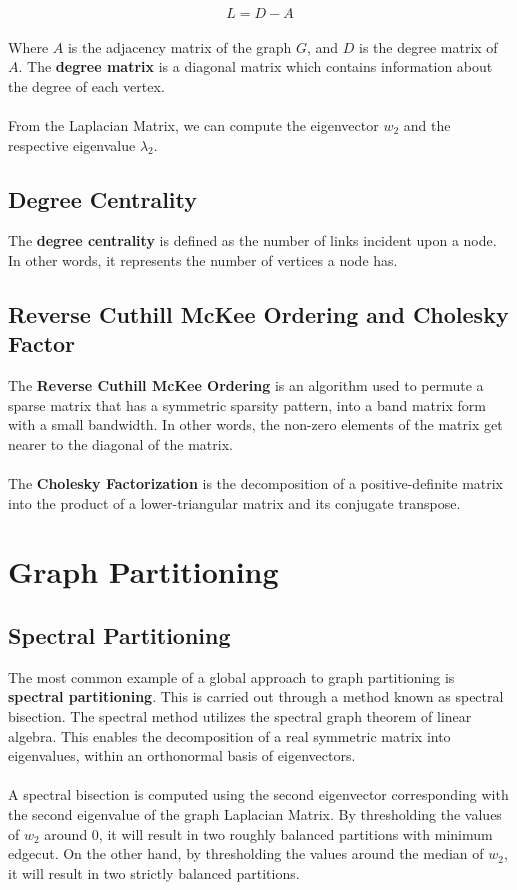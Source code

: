 \documentclass{article}
\begin{document}
\[ L = D - A \] \\
Where $A$ is the adjacency matrix of the graph $G$, and $D$ is the degree matrix of $A$. The \textbf{degree matrix} is a diagonal matrix which contains information about the degree of each vertex. \\ \\
From the Laplacian Matrix, we can compute the eigenvector $w_2$ and the respective eigenvalue $\lambda_2$.

\subsection{Degree Centrality}
The \textbf{degree centrality} is defined as the number of links incident upon a node. In other words, it represents the number of vertices a node has.

\subsection{Reverse Cuthill McKee Ordering and Cholesky Factor}
The \textbf{Reverse Cuthill McKee Ordering} is an algorithm used to permute a sparse matrix that has a symmetric sparsity pattern, into a band matrix form with a small bandwidth. In other words, the non-zero elements of the matrix get nearer to the diagonal of the matrix. \\ \\
The \textbf{Cholesky Factorization} is the decomposition of a positive-definite matrix into the product of a lower-triangular matrix and its conjugate transpose.

\section{Graph Partitioning}
\subsection{Spectral Partitioning}
The most common example of a global approach to graph partitioning is \textbf{spectral partitioning}. This is carried out through a method known as spectral bisection. The spectral method utilizes the spectral graph theorem of linear algebra. This enables the decomposition of a real symmetric matrix into eigenvalues, within an orthonormal basis of eigenvectors. \\ \\
A spectral bisection is computed using the second eigenvector corresponding with the second eigenvalue of the graph Laplacian Matrix. By thresholding the values of $w_2$ around 0, it will result in two roughly balanced partitions with minimum edgecut. On the other hand, by thresholding the values around the median of $w_2$, it will result in two strictly balanced partitions.
\end{document}
